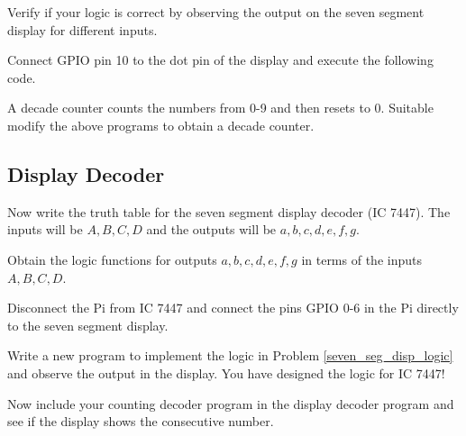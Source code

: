 \begin{problem}
Verify if your logic is correct by observing the output on the seven segment display for different inputs.
\end{problem}
%
\begin{problem}
Connect GPIO pin 10 to the dot pin of the display and execute the following code.
\end{problem}

%
%
\begin{problem}
A decade counter counts the numbers from 0-9 and then resets to 0.  Suitable modify the above programs to obtain a decade counter.
\end{problem}

\subsection{Display Decoder}
%
\begin{problem}
Now write the truth table for the seven segment display decoder (IC 7447).  The inputs will be $A,B,C,D$ and the outputs will be $a,b,c,d,e,f,g$.
\end{problem}
%
\begin{problem}
\label{seven_seg_disp_logic}
Obtain the logic functions for outputs $a,b,c,d,e,f,g$ in terms of the inputs $A,B,C,D$.
\end{problem}
\begin{problem}
Disconnect the Pi from IC 7447 and connect the pins GPIO 0-6 in the Pi directly to the seven segment display.
\end{problem}
\begin{problem}
Write a new program to implement the logic in Problem \ref{seven_seg_disp_logic} and observe the output in the display.  You have designed the logic for IC 7447!
\end{problem}
\begin{problem}
Now include your counting decoder program in the  display decoder program
and see if the display shows the consecutive number.
\end{problem}




